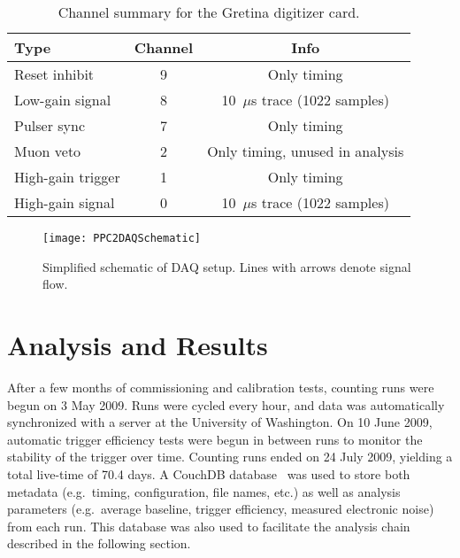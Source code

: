 			\begin{table}
				\centering
				\begin{tabular}{l|c|c}
					Type & Channel &  Info \\
					\hline
					\hline
					Reset inhibit & 9 & Only timing \\
					\hline
					Low-gain signal & 8 & 10~$\mu$s trace (1022	 samples) \\
					\hline
					Pulser sync & 7 & Only timing \\
					\hline				
					Muon veto & 2 & Only timing, unused in analysis \\
					\hline								
					High-gain trigger & 1 & Only timing \\
					\hline								
					High-gain signal & 0 & 10~$\mu$s trace (1022 samples) \\				
					\hline
					\hline
				\end{tabular}
				\caption[Channel summary for the Gretina digitizer card]
				{Channel summary for the Gretina digitizer card.  }
				\label{tab:PPC2DAQChannelInfo}
			\end{table}	     
	
	
			\begin{sidewaysfigure}
				\centering
				\texttt{[image: PPC2DAQSchematic]}
				\caption[Simplified schematic of DAQ setup] 
				{Simplified schematic of DAQ setup.  Lines with arrows denote signal flow.}
				\label{fig:PPC2DAQSetup}
			\end{sidewaysfigure}
		     			
	\section{Analysis and Results}
	\label{sec:DeploymentPPC2SoudanAnalysis}
	
	After a few months of commissioning and calibration tests, counting runs were begun on 3 May 2009.  Runs were cycled every hour, and data was automatically synchronized with a server at the University of Washington.  On 10 June 2009, automatic trigger efficiency tests were begun in between runs to monitor the stability of the trigger over time.  Counting runs ended on 24 July 2009, yielding a total live-time of 70.4 days.  A CouchDB database~\cite{CouchDB} was used to store both metadata (e.g.~timing, configuration, file names, etc.) as well as analysis parameters (e.g.~average baseline, trigger efficiency, measured electronic noise) from each run.  This database was also used to facilitate the analysis chain described in the following section.    


